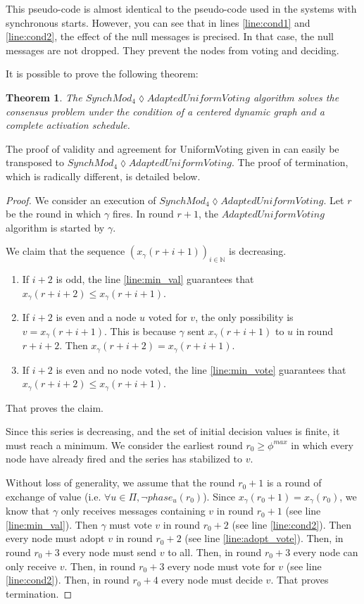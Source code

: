 \documentclass[11pt,letterpaper]{article}
\newtheorem{thm}{Theorem}
\newcommand{\cent}{\gamma}
\begin{document}
This pseudo-code is almost identical to the pseudo-code used in the systems with synchronous starts.
However, you can see that in lines \ref{line:cond1} and \ref{line:cond2}, the effect of the null messages is precised.
In that case, the null messages are not dropped. They prevent the nodes from voting and deciding.

It is possible to prove the following theorem:

\begin{thm}
	The $SynchMod_4 \lozenge AdaptedUniformVoting$ algorithm solves the consensus problem under the condition of a centered dynamic graph and a complete activation schedule.
\end{thm}

The proof of validity and agreement for UniformVoting given in \cite{CBS09} can easily be transposed to \newline $SynchMod_4 \lozenge AdaptedUniformVoting$.
The proof of termination, which is radically different, is detailed below.

\begin{proof}
	We consider an execution of $SynchMod_4 \lozenge AdaptedUniformVoting$.
	Let $r$ be the round in which $\cent$ fires.
	In round $r+1$, the $AdaptedUniformVoting$ algorithm is started by $\cent$.

	We claim that the sequence $(x_\cent(r+i+1))_{i \in \mathds{N}}$ is decreasing.
	\begin{enumerate}
		\item If $i+2$ is odd, the line \ref{line:min_val} guarantees that $x_\cent(r+i+2) \leq x_\cent(r+i+1)$.
		\item If $i+2$ is even and a node $u$ voted for $v$, the only possibility is $v = x_\cent(r+i+1)$. This is because $\cent$ sent $x_\cent(r+i+1)$ to $u$ in round $r+i+2$.
			Then $x_\cent(r+i+2) = x_\cent(r+i+1)$.
		\item If $i+2$ is even and no node voted, the line \ref{line:min_vote} guarantees that $x_\cent(r+i+2) \leq x_\cent(r+i+1)$.
	\end{enumerate}
	That proves the claim.

	Since this series is decreasing, and the set of initial decision values is finite, it must reach a minimum.
	We consider the earliest round $r_0 \geq \phi^{max}$ in which every node have already fired and the series has stabilized to $v$.

	Without loss of generality, we assume that the round $r_0+1$ is a round of exchange of value (i.e. $\forall u \in \Pi, \neg phase_u(r_0)$).
	Since $x_\cent(r_0+1) = x_\cent(r_0)$, we know that $\cent$ only receives messages containing $v$ in round $r_0+1$ (see line \ref{line:min_val}).
	Then $\cent$ must vote $v$ in round $r_0+2$ (see line \ref{line:cond2}).
	Then every node must adopt $v$ in round $r_0+2$ (see line \ref{line:adopt_vote}).
	Then, in round $r_0+3$ every node must send $v$ to all.
	Then, in round $r_0+3$ every node can only receive $v$.
	Then, in round $r_0+3$ every node must vote for $v$ (see line \ref{line:cond2}).
	Then, in round $r_0+4$ every node must decide $v$.
	That proves termination.
\end{proof}
\end{document}
